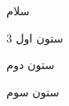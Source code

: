 \documentclass[]{book}
\begin{document}
    سلام

    \begin{multicols}{3}
        ستون اول

        ستون دوم

        ستون سوم
    \end{multicols}
\end{document}
